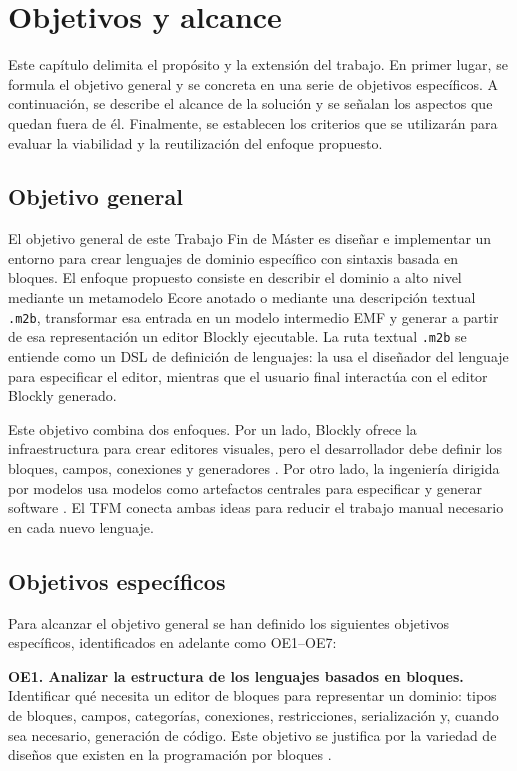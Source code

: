 \chapter{Objetivos y alcance}
\label{chap:objetivos}

Este capítulo delimita el propósito y la extensión del trabajo. En primer
lugar, se formula el objetivo general y se concreta en una serie de objetivos
específicos. A continuación, se describe el alcance de la solución y se señalan
los aspectos que quedan fuera de él. Finalmente, se establecen los criterios
que se utilizarán para evaluar la viabilidad y la reutilización del enfoque
propuesto.

\section{Objetivo general}
\label{sec:objetivo-general}

El objetivo general de este Trabajo Fin de Máster es diseñar e implementar un
entorno para crear lenguajes de dominio específico con sintaxis basada en
bloques. El enfoque propuesto consiste en describir el dominio a alto nivel
mediante un metamodelo Ecore anotado o mediante una descripción textual
\texttt{.m2b}, transformar esa entrada en un modelo intermedio EMF y generar a
partir de esa representación un editor Blockly ejecutable. La ruta textual
\texttt{.m2b} se entiende como un DSL de definición de lenguajes: la usa el
diseñador del lenguaje para especificar el editor, mientras que el usuario final
interactúa con el editor Blockly generado.

Este objetivo combina dos enfoques. Por un lado, Blockly ofrece la infraestructura para
crear editores visuales, pero el desarrollador debe definir los bloques, campos,
conexiones y generadores \cite{blocklyWhatIs}. Por otro lado, la ingeniería
dirigida por modelos usa modelos como artefactos centrales para especificar y
generar software \cite{brambilla2017modelDriven}. El TFM conecta ambas ideas para
reducir el trabajo manual necesario en cada nuevo lenguaje.

\section{Objetivos específicos}
\label{sec:objetivos-especificos}

Para alcanzar el objetivo general se han definido los siguientes objetivos
específicos, identificados en adelante como OE1--OE7:

\noindent\textbf{OE1. Analizar la estructura de los lenguajes basados en
bloques.} Identificar qué necesita un editor de bloques para representar un
dominio: tipos de bloques, campos, categorías, conexiones, restricciones,
serialización y, cuando sea necesario, generación de código. Este objetivo se
justifica por la variedad de diseños que existen en la programación por bloques
\cite{lin2021landscape}.

